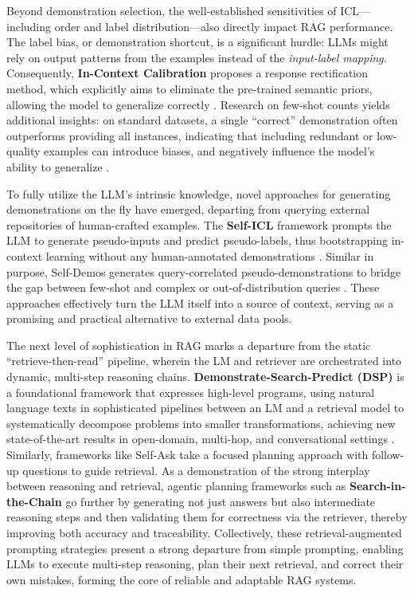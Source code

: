 \documentclass[11pt]{article}
\begin{document}
Beyond demonstration selection, the well-established sensitivities of ICL---including order and label distribution---also directly impact RAG performance. The label bias, or demonstration shortcut, is a significant hurdle: LLMs might rely on output patterns from the examples instead of the \emph{input-label mapping}. Consequently, \textbf{In-Context Calibration} proposes a response rectification method, which explicitly aims to eliminate the pre-trained semantic priors, allowing the model to generalize correctly \cite{ref132}. Research on few-shot counts yields additional insights: on standard datasets, a single ``correct'' demonstration often outperforms providing all instances, indicating that including redundant or low-quality examples can introduce biases, and negatively influence the model's ability to generalize \cite{ref133}.

To fully utilize the LLM's intrinsic knowledge, novel approaches for generating demonstrations on the fly have emerged, departing from querying external repositories of human-crafted examples. The \textbf{Self-ICL} framework prompts the LLM to generate pseudo-inputs and predict pseudo-labels, thus bootstrapping in-context learning without any human-annotated demonstrations \cite{ref134}. Similar in purpose, Self-Demos generates query-correlated pseudo-demonstrations to bridge the gap between few-shot and complex or out-of-distribution queries \cite{ref135}. These approaches effectively turn the LLM itself into a source of context, serving as a promising and practical alternative to external data pools.

The next level of sophistication in RAG marks a departure from the static ``retrieve-then-read'' pipeline, wherein the LM and retriever are orchestrated into dynamic, multi-step reasoning chains. \textbf{Demonstrate-Search-Predict (DSP)} is a foundational framework that expresses high-level programs, using natural language texts in sophisticated pipelines between an LM and a retrieval model to systematically decompose problems into smaller transformations, achieving new state-of-the-art results in open-domain, multi-hop, and conversational settings \cite{ref136}. Similarly, frameworks like Self-Ask take a focused planning approach with follow-up questions to guide retrieval. As a demonstration of the strong interplay between reasoning and retrieval, agentic planning frameworks such as \textbf{Search-in-the-Chain} \cite{ref107} go further by generating not just answers but also intermediate reasoning steps and then validating them for correctness via the retriever, thereby improving both accuracy and traceability. Collectively, these retrieval-augmented prompting strategies present a strong departure from simple prompting, enabling LLMs to execute multi-step reasoning, plan their next retrieval, and correct their own mistakes, forming the core of reliable and adaptable RAG systems.
\end{document}
